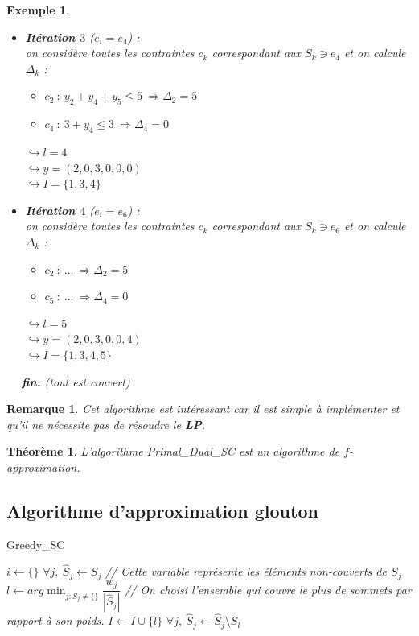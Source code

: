 \documentclass[12pt]{article}
\newcommand{\titre}[1]{\textcolor{title}{#1}}
\newtheorem{exemple}{Exemple}[section]
\newtheorem{rem}{Remarque}[section]
\newtheorem{thm}{Th\'eor\`eme}[section]
\begin{document}
\begin{exemple}
\begin{itemize}
	$\hookrightarrow y = (2,0,3,0,0,0)$\\
	$\hookrightarrow I = \{1,3\}$\\
\item \textbf{Itération $3$} ($e_i = e_4$) :\\
on considère toutes les contraintes $c_k$ correspondant aux $S_k \ni e_4$ et on
calcule $\Delta_k$ :
	\begin{itemize}
	\item $c_2\ :\ y_2+y_4+y_5 \leq 5\ \Rightarrow \Delta_2 = 5$
	\item $c_4\ :\ 3+y_4 \leq 3\ \Rightarrow \Delta_4 = 0$
	\end{itemize}
	$\hookrightarrow l = 4$\\
	$\hookrightarrow y = (2,0,3,0,0,0)$\\
	$\hookrightarrow I = \{1,3,4\}$ \\
\item \textbf{Itération $4$} ($e_i = e_6$) :\\
on considère toutes les contraintes $c_k$ correspondant aux $S_k \ni e_6$ et on
calcule $\Delta_k$ :
	\begin{itemize}
	\item $c_2\ :\ \ldots\ \Rightarrow \Delta_2 = 5$
	\item $c_5\ :\ \ldots\ \Rightarrow \Delta_4 = 0$
	\end{itemize}
	$\hookrightarrow l = 5$\\
	$\hookrightarrow y = (2,0,3,0,0,4)$\\
	$\hookrightarrow I = \{1,3,4,5\}$
\end{itemize}
\indent$\quad$ \textbf{fin.} \textit{(tout est couvert)}
\end{exemple}

\begin{rem}
Cet algorithme est intéressant car il est simple à implémenter et qu'il ne
nécessite pas de résoudre le \titre{\textbf{LP}}.
\end{rem}

\begin{thm}
L'algorithme Primal\_Dual\_SC est un algorithme de $f$-approximation.
\end{thm}

\subsection{Algorithme d'approximation glouton}

\begin{algorithm}[h!]
\caption{Greedy\_SC}
\begin{algorithmic}[1]
\STATE $i\leftarrow \{\}$
\STATE $\forall j,\ \hat{S}_j \leftarrow S_j$ \textit{\scriptsize // Cette variable
représente les éléments non-couverts de $S_j$}
\STATE $l\leftarrow arg\min_{j:\hat{S}_j \neq \{\}} \dfrac{w_j}{|\hat{S}_j|}$
\textit{ \scriptsize // On choisi l'ensemble qui couvre le plus de sommets par rapport à son
poids.}
\STATE $I \leftarrow I\cup \{l\}$
\STATE $\forall j,\ \hat{S}_j \leftarrow \hat{S}_j \setminus S_l$
\ENDWHILE
\end{algorithmic}
\end{algorithm}
\end{document}
